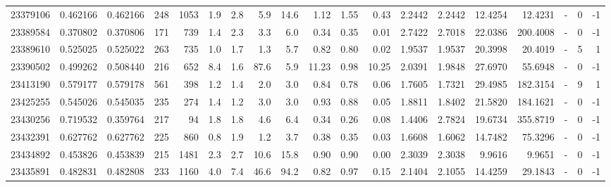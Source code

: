 \begin{tabular}{rrrrrrrrrrrrrrrrlrr}
  23379106 & 0.462166 &   0.462166 &  248 & 1053 &      1.9 &      2.8 &     5.9 &     14.6 &       1.12 &        1.55 &        0.43 &  2.2442 &  2.2442 &   12.4254 &   12.4231 &             - &        0 &         -1 \\
  23389584 & 0.370802 &   0.370806 &  171 &  739 &      1.4 &      2.3 &     3.3 &      6.0 &       0.34 &        0.35 &        0.01 &  2.7422 &  2.7018 &   22.0386 &  200.4008 &             - &        0 &         -1 \\
  23389610 & 0.525025 &   0.525022 &  263 &  735 &      1.0 &      1.7 &     1.3 &      5.7 &       0.82 &        0.80 &        0.02 &  1.9537 &  1.9537 &   20.3998 &   20.4019 &             - &        5 &          1 \\
  23390502 & 0.499262 &   0.508440 &  216 &  652 &      8.4 &      1.6 &    87.6 &      5.9 &      11.23 &        0.98 &       10.25 &  2.0391 &  1.9848 &   27.6970 &   55.6948 &             - &        0 &         -1 \\
  23413190 & 0.579177 &   0.579178 &  561 &  398 &      1.2 &      1.4 &     2.0 &      3.0 &       0.84 &        0.78 &        0.06 &  1.7605 &  1.7321 &   29.4985 &  182.3154 &             - &        9 &          1 \\
  23425255 & 0.545026 &   0.545035 &  235 &  274 &      1.4 &      1.2 &     3.0 &      3.0 &       0.93 &        0.88 &        0.05 &  1.8811 &  1.8402 &   21.5820 &  184.1621 &             - &        0 &         -1 \\
  23430256 & 0.719532 &   0.359764 &  217 &   94 &      1.8 &      1.8 &     4.6 &      6.4 &       0.34 &        0.26 &        0.08 &  1.4406 &  2.7824 &   19.6734 &  355.8719 &             - &        0 &         -1 \\
  23432391 & 0.627762 &   0.627762 &  225 &  860 &      0.8 &      1.9 &     1.2 &      3.7 &       0.38 &        0.35 &        0.03 &  1.6608 &  1.6062 &   14.7482 &   75.3296 &             - &        0 &         -1 \\
  23434892 & 0.453826 &   0.453839 &  215 & 1481 &      2.3 &      2.7 &    10.6 &     15.8 &       0.90 &        0.90 &        0.00 &  2.3039 &  2.3038 &    9.9616 &    9.9651 &             - &        0 &         -1 \\
  23435891 & 0.482831 &   0.482808 &  233 & 1160 &      4.0 &      7.4 &    46.6 &     94.2 &       0.82 &        0.97 &        0.15 &  2.1404 &  2.1055 &   14.4259 &   29.1843 &             - &        0 &         -1 \\

\end{tabular}
